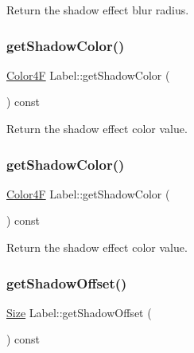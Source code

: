Return the shadow effect blur radius. \mbox{\label{classLabel_a5a17b13a523cd53169bf248cfd45c776}} 
\subsubsection{\texorpdfstring{get\+Shadow\+Color()}{getShadowColor()}\hspace{0.1cm}{\footnotesize\ttfamily [1/2]}}
{\footnotesize\ttfamily \hyperlink{structColor4F}{Color4F} Label\+::get\+Shadow\+Color (\begin{DoxyParamCaption}{ }\end{DoxyParamCaption}) const\hspace{0.3cm}{\ttfamily [inline]}}

Return the shadow effect color value. \mbox{\label{classLabel_a5a17b13a523cd53169bf248cfd45c776}} 
\subsubsection{\texorpdfstring{get\+Shadow\+Color()}{getShadowColor()}\hspace{0.1cm}{\footnotesize\ttfamily [2/2]}}
{\footnotesize\ttfamily \hyperlink{structColor4F}{Color4F} Label\+::get\+Shadow\+Color (\begin{DoxyParamCaption}{ }\end{DoxyParamCaption}) const\hspace{0.3cm}{\ttfamily [inline]}}

Return the shadow effect color value. \mbox{\label{classLabel_a46496ccac5e3a936cb0008db68a0e91e}} 
\subsubsection{\texorpdfstring{get\+Shadow\+Offset()}{getShadowOffset()}\hspace{0.1cm}{\footnotesize\ttfamily [1/2]}}
{\footnotesize\ttfamily \hyperlink{classSize}{Size} Label\+::get\+Shadow\+Offset (\begin{DoxyParamCaption}{ }\end{DoxyParamCaption}) const\hspace{0.3cm}{\ttfamily [inline]}}

